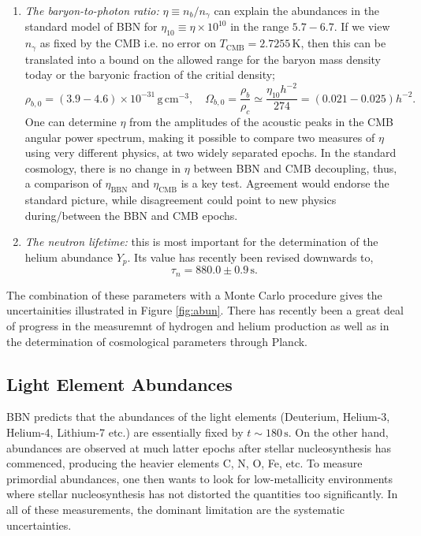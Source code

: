 \documentclass[11pt]{article}
\numberwithin{equation}{section}
\numberwithin{figure}{section}
\numberwithin{table}{section}
\begin{document}
\begin{enumerate}
\item \textit{The baryon-to-photon ratio:} $\eta \equiv n_b/n_\gamma$ can explain the abundances in the standard model of BBN for $\eta_{10} \equiv \eta \times 10^{10}$ in the range $5.7 - 6.7$. If we view $n_\gamma$ as fixed by the CMB i.e. no error on $T_{\mathrm{CMB}} = 2.7255 \, \mathrm{K}$, then this can be translated into a bound on the allowed range for the baryon mass density today or the baryonic fraction of the critial density;
\begin{equation}
\rho_{b, 0} = (3.9 - 4.6) \times 10^{-31} \, \mathrm{g}\, \mathrm{cm}^{-3}, \quad \Omega_{b, 0} = \frac{\rho_b}{\rho_c} \simeq \frac{\eta_{10}h^{-2}}{274} = (0.021 - 0.025)h^{-2}.
\end{equation}
One can determine $\eta$ from the amplitudes of the acoustic peaks in the CMB
angular power spectrum, making it possible to compare two measures of $\eta$ using
very different physics, at two widely separated epochs. In the standard cosmology, there
is no change in $\eta$ between BBN and CMB decoupling, thus, a comparison of $\eta_{\mathrm{BBN}}$ and $\eta_{\mathrm{CMB}}$ is a key test. Agreement would endorse the standard picture, while disagreement could point to new physics during/between the BBN and CMB epochs.
\item \textit{The neutron lifetime:} this is most important for the determination of the helium abundance $Y_p$. Its value has recently been revised downwards to,
\begin{equation}
\tau_n = 880.0 \pm 0.9 \, \mathrm{s}.
\end{equation}
\end{enumerate}
The combination of these parameters with a Monte Carlo procedure gives the uncertainities illustrated in Figure \ref{fig:abun}. There has recently been a great deal of progress in the measuremnt of hydrogen and helium production as well as in the determination of cosmological parameters through Planck.


\subsection{Light Element Abundances}

BBN predicts that the abundances of the light elements (Deuterium, Helium-3, Helium-4, Lithium-7 etc.) are essentially fixed by $t \sim 180 \, \mathrm{s}$. On the other hand, abundances are observed at much latter epochs after stellar nucleosynthesis has commenced, producing the heavier elements C, N, O, Fe, etc. To measure primordial abundances, one then wants to look for low-metallicity environments where stellar nucleosynthesis has not distorted the quantities too significantly. In all of these measurements, the dominant limitation are the systematic uncertainties.
\end{document}

